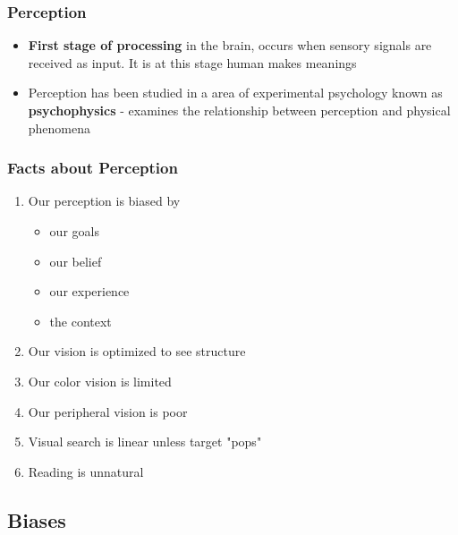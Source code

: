 \documentclass{beamer}
\begin{document}
\begin{frame}
	\frametitle{Perception}
	\begin{itemize}
		\item \textbf{First stage of processing} in the brain, occurs when sensory signals are received as input.  It is at this stage human makes meanings
		\item Perception has been studied in a area of experimental psychology known as \textbf{psychophysics} - examines the relationship between perception and physical phenomena
	\end{itemize}
\end{frame}

\begin{frame}
\frametitle{Facts about Perception}
\begin{enumerate}
	\item Our perception is biased by
	\begin{itemize}
		\item our goals
		\item our belief
		\item our experience
		\item the context
	\end{itemize}
	\item Our vision is optimized to see structure
	\item Our color vision is limited
	\item Our peripheral vision is poor
	\item Visual search is linear unless target "pops"
	\item Reading is unnatural
\end{enumerate}
\end{frame}

\subsection{Biases}
\end{document}
